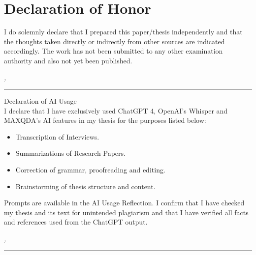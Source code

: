 %
\chapter*{Declaration of Honor}
\label{sec:declaration}
\thispagestyle{empty}

\vspace*{-10mm}

I do solemnly declare that I prepared this paper/thesis independently and that the thoughts taken directly or indirectly from other sources are indicated accordingly.
The work has not been submitted to any other examination authority and also not
yet been published.

\bigskip

\noindent\textit{\thesisUniversityCity, \thesisDate}

\smallskip

\begin{flushright}
	\begin{minipage}{5cm}
		\rule{\textwidth}{1pt}
		\centering\thesisName
	\end{minipage}
\end{flushright}

\vspace*{20mm}

{Declaration of AI Usage} \\

I declare that I have exclusively used ChatGPT 4, OpenAI's Whisper and MAXQDA's AI features in my thesis for the purposes listed below:

\begin{itemize}
	\item Transcription of Interviews.
	\item Summarizations of Research Papers.
	\item Correction of grammar, proofreading and editing.
	\item Brainstorming of thesis structure and content.
\end{itemize}

Prompts are available in the AI Usage Reflection.
I confirm that I have checked my thesis and its text for unintended plagiarism and that I have verified all facts and references used from the ChatGPT output.

\bigskip

\noindent\textit{\thesisUniversityCity, \thesisDate}

\smallskip

\begin{flushright}
	\begin{minipage}{5cm}
		\rule{\textwidth}{1pt}
		\centering\thesisName
	\end{minipage}
\end{flushright}

